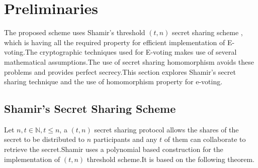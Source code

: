 \documentclass[conference]{IEEEtran}
\begin{document}
\section{Preliminaries}

The proposed scheme uses Shamir's threshold $(t,n)$ secret sharing scheme \cite{shamir1979}, which is having all the required property for efficient implementation of E-voting.The cryptographic techniques used for E-voting makes use of several mathematical assumptions.The use of secret sharing homomorphism avoids these problems and provides perfect secrecy.This section explores Shamir's secret sharing technique and the use of homomorphism property for e-voting.

\subsection{Shamir's Secret Sharing Scheme}

Let $n,t \in \mathbb{N}, t\le n$, a $(t,n)$ secret sharing protocol allows the shares of the secret to be distributed to $n$ participants and any $t$ of them can collaborate to retrieve the secret.Shamir \cite{shamir1979} uses a polynomial based construction for the implementation of  $(t,n)$ threshold scheme.It is based on the following theorem.
\end{document}
